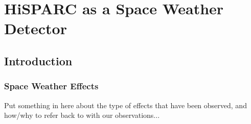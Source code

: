 \chapter{HiSPARC as a Space Weather Detector}\label{chap:HiSPARC}

\section{Introduction}\label{sec:HS_intro}

%
%
%
%


\subsection{Space Weather Effects}

Put something in here about the type of effects that have been observed, and how/why to refer back to with our observations...


